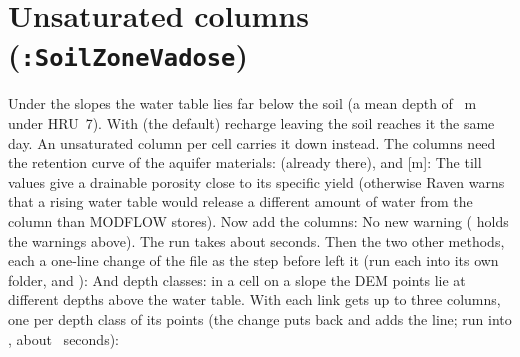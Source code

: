 \section{Unsaturated columns (\texttt{:SoilZoneVadose})}\label{sec:t3vz}
Under the slopes the water table lies far below the soil (a mean depth of ~m under HRU~7). With  (the default) recharge
leaving the soil reaches it the same day. An unsaturated column per cell carries it down instead. The columns need the
retention curve of the aquifer materials:  (already there),  and  [m]:
The till values give a drainable porosity close to its specific yield (otherwise Raven warns that a rising water table
would release a different amount of water from the column than MODFLOW stores). Now add the columns:
No new warning ( holds the  warnings above). The run takes about 
seconds. Then the two other methods, each a one-line change of the file as the step before left it (run each into its own folder,
 and ):
And depth classes: in a cell on a slope the DEM points lie at different depths above the water table. With
 each link gets up to three columns, one per depth class of its points (the change puts  back and adds the
line; run into , about ~seconds):

